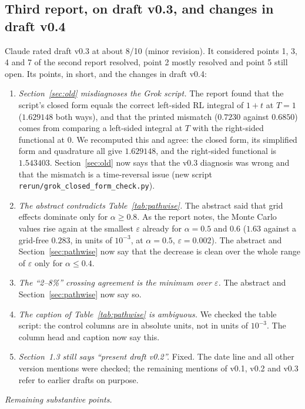 \documentclass[11pt]{article}
\theoremstyle{remark}
\theoremstyle{definition}
\begin{document}
\subsection{Third report, on draft v0.3, and changes in draft v0.4}\label{app:referee3}
Claude rated draft v0.3 at about 8/10 (minor revision). It considered points 1, 3, 4 and 7 of the second report resolved, point 2 mostly resolved and point 5 still open. Its points, in short, and the changes in draft v0.4:
\begin{enumerate}
\item \emph{Section~\ref{sec:old} misdiagnoses the Grok script.} The report found that the script's closed form equals the correct left-sided RL integral of $1+t$ at $T=1$ ($1.629148$ both ways), and that the printed mismatch ($0.7230$ against $0.6850$) comes from comparing a left-sided integral at $T$ with the right-sided functional at $0$. We recomputed this and agree: the closed form, its simplified form and quadrature all give $1.629148$, and the right-sided functional is $1.543403$. Section~\ref{sec:old} now says that the v0.3 diagnosis was wrong and that the mismatch is a time-reversal issue (new script \texttt{rerun/grok\_closed\_form\_check.py}).
\item \emph{The abstract contradicts Table~\ref{tab:pathwise}.} The abstract said that grid effects dominate only for $\alpha\ge0.8$. As the report notes, the Monte Carlo values rise again at the smallest $\varepsilon$ already for $\alpha=0.5$ and $0.6$ ($1.63$ against a grid-free $0.283$, in units of $10^{-3}$, at $\alpha=0.5$, $\varepsilon=0.002$). The abstract and Section~\ref{sec:pathwise} now say that the decrease is clean over the whole range of $\varepsilon$ only for $\alpha\le0.4$.
\item \emph{The ``2--8\%'' crossing agreement is the minimum over $\varepsilon$.} The abstract and Section~\ref{sec:pathwise} now say so.
\item \emph{The caption of Table~\ref{tab:pathwise} is ambiguous.} We checked the table script: the control columns are in absolute units, not in units of $10^{-3}$. The column head and caption now say this.
\item \emph{Section~1.3 still says ``present draft v0.2''.} Fixed. The date line and all other version mentions were checked; the remaining mentions of v0.1, v0.2 and v0.3 refer to earlier drafts on purpose.
\end{enumerate}
\emph{Remaining substantive points.}
\end{document}
